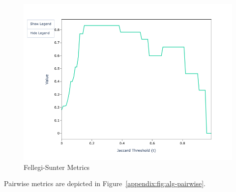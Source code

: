 \documentclass{article}
\begin{document}
\begin{figure}[htbp]
\begin{minipage}{0.32\textwidth}
            \includegraphics[width=\textwidth]{sample-usage/mini-fs-f1}
        \end{minipage}
        \caption{Fellegi-Sunter Metrics}\label{appendix:fig:fs-figures}
    \end{figure}

    Pairwise metrics are depicted in Figure~\ref{appendix:fig:alg-pairwise}.
\end{document}
